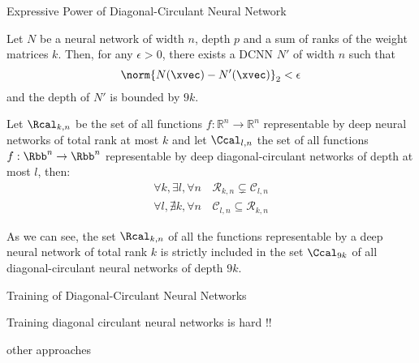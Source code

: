 \begin{frame}{Expressive Power of Diagonal-Circulant Neural Network}

  \begin{theorem}
    Let $N$ be a neural network of width $n$, depth $p$ and a sum of ranks of the weight matrices $k$.
    Then, for any $\epsilon>0$, there exists a DCNN $N'$ of width $n$ such that 
    \begin{equation}
      \norm{N(\xvec) - N'(\xvec) }_2 < \epsilon
    \end{equation}
    and the depth of $N'$ is bounded by $9k$.
  \end{theorem}


  Let $\Rcal_{k,n}$ be the set of all functions $f:\mathbb{R}^{n}\rightarrow\mathbb{R}^{n}$ representable by deep neural networks of total rank at most $k$ and let $\Ccal_{l,n}$ the set of all functions $f:\Rbb^{n} \rightarrow \Rbb^{n}$ representable by deep diagonal-circulant networks of depth at most $l$, then:
    \begin{align*}
      \forall k,\exists l,\forall n\, & \mathcal{R}_{k,n}\varsubsetneq\mathcal{C}_{l,n} \\
      \forall l,\nexists k,\forall n\, & \mathcal{C}_{l,n}\subseteq\mathcal{R}_{k,n}
    \end{align*}

  As we can see, the set $\Rcal_{k,n}$ of all the functions representable by a deep neural network of total rank $k$ is strictly included in the set $\Ccal_{9k}$ of all diagonal-circulant neural networks of depth $9k$. 

  \begin{figure}[htb]
    \scalebox{0.65}{}
  \end{figure}

  
\end{frame}


\begin{frame}{Training of Diagonal-Circulant Neural Networks}

  Training diagonal circulant neural networks is hard !!

  other approaches

\end{frame}



